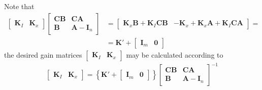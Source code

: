 \documentclass[12pt,a4paper,oneside]{book}
\begin{document}
\begin{onehalfspace}
Note that
\begin{equation}
	\begin{aligned}
		\begin{bmatrix} 
			\mathbf{K}_I & \mathbf{K}_x
		\end{bmatrix}
		\begin{bmatrix} 
			\mathbf{C}\mathbf{B} & \mathbf{C}\mathbf{A} \\[6pt] 
			\mathbf{B} & \mathbf{A}-\mathbf{I}_n
		\end{bmatrix} &=
		\begin{bmatrix} 
			\mathbf{K}_x\mathbf{B} +\mathbf{K}_I\mathbf{C}\mathbf{B} & 
			-\mathbf{K}_x+\mathbf{K}_x\mathbf{A}+\mathbf{K}_I\mathbf{C}\mathbf{A}\end{bmatrix}
		= \\[6pt] 
		&=\mathbf{K'} + \begin{bmatrix} 
			\mathbf{I}_m & \mathbf{0}
		\end{bmatrix}
	\end{aligned}
\end{equation}
the desired gain matrices $		\begin{bmatrix} \mathbf{K}_I & \mathbf{K}_x \end{bmatrix}$ may be calculated according to
\begin{equation}
	\begin{aligned}
		\begin{bmatrix} 
			\mathbf{K}_I & \mathbf{K}_x
		\end{bmatrix} = \left\lbrace \mathbf{K'}+
		\begin{bmatrix} 
			\mathbf{I}_m & \mathbf{0}
		\end{bmatrix}\right\rbrace 
		\begin{bmatrix} 
			\mathbf{C}\mathbf{B} & \mathbf{C}\mathbf{A} \\[6pt] 
			\mathbf{B} & \mathbf{A}-\mathbf{I}_n
		\end{bmatrix}^{-1}
	\end{aligned}
\end{equation}


\end{onehalfspace}
\end{document}

